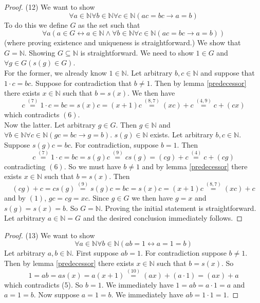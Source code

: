 \documentclass{report}
\begin{document}
\begin{proof}(12)
We want to show
\begin{equation*}
\forall a\in\mathbb N\forall b\in\mathbb N\forall c\in\mathbb N(ac=bc\to a=b)
\end{equation*}
To do this we define $G$ as the set such that
\begin{equation*}
\forall a(a\in G\leftrightarrow a\in\mathbb N\land\forall b\in\mathbb N\forall c\in\mathbb N(ac=bc\to a=b))
\end{equation*}
(where proving existence and uniqueness is straightforward.) We show that $G=\mathbb N$.
Showing $G\subseteq\mathbb N$ is straightforward. We need to show $1\in G$ and $\forall g\in G(s(g)\in G)$.\\
\indent For the former, we already know $1\in\mathbb N$. Let arbitrary $b,c\in\mathbb N$ and suppose that $1\cdot c=bc$. Suppose for contradiction that $b\neq1$. Then by lemma \ref{predecessor}
there exists $x\in\mathbb N$ such that $b=s(x)$. We then have
\begin{equation*}
c\overset{(7)}{=}1\cdot c=bc=s(x)c=(x+1)c\overset{(8,7)}{=}(xc)+c\overset{(4,9)}{=}c+(cx)
\end{equation*}
which contradicts $(6)$.\\
\indent Now the latter. Let arbitrary $g\in G$. Then $g\in\mathbb N$ and $\forall b\in\mathbb N\forall c\in\mathbb N(gc=bc\to g=b)$. $s(g)\in\mathbb N$ exists. Let arbitrary $b,c\in\mathbb N$.
Suppose $s(g)c=bc$. For contradiction, suppose $b=1$. Then
\begin{equation*}
c\overset{(7)}{=}1\cdot c=bc=s(g)c\overset{(9)}{=}cs(g)=(cg)+c\overset{(4)}{=}c+(cg)
\end{equation*}
contradicting $(6)$. So we must have $b\neq1$ and by lemma \ref{predecessor}
there exists $x\in\mathbb N$ such that $b=s(x)$. Then
\begin{equation*}
(cg)+c=cs(g)\overset{(9)}{=}s(g)c=bc=s(x)c=(x+1)c\overset{(8,7)}{=}(xc)+c
\end{equation*}
and by $(1)$, $gc=cg=xc$. Since $g\in G$ we then have $g=x$ and $s(g)=s(x)=b$.
So $G=\mathbb N$. Proving the initial statement is straightforward. Let arbitrary $a\in\mathbb N=G$
and the desired conclusion immediately follows.
\end{proof}
\begin{proof}(13)
We want to show
\begin{equation*}
\forall a\in\mathbb N\forall b\in\mathbb N(ab=1\leftrightarrow a=1=b)
\end{equation*}
Let arbitrary $a,b\in\mathbb N$. First suppose $ab=1$. For contradiction suppose $b\neq1$.
Then by lemma \ref{predecessor} there exists $x\in\mathbb N$ such that $b=s(x)$. So
\begin{equation*}
1=ab=as(x)=a(x+1)\overset{(10)}{=}(ax)+(a\cdot1)=(ax)+a
\end{equation*}
which contradicts (5). So $b=1$. We immediately have $1=ab=a\cdot1=a$ and $a=1=b$. Now suppose $a=1=b$. We immediately have $ab=1\cdot1=1$.
\end{proof}
\newpage
\end{document}
